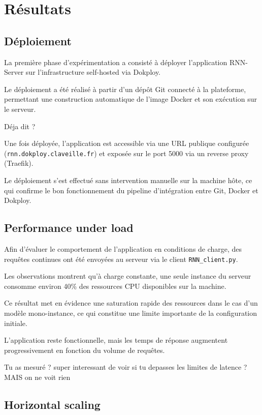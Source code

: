 \documentclass{rapportClass} %
\begin{document}
\chapter{Résultats}

\section{Déploiement}

La première phase d’expérimentation a consisté à déployer l’application
RNN-Server sur l’infrastructure self-hosted via Dokploy.

Le déploiement a été réalisé à partir d’un dépôt Git connecté à la
plateforme, permettant une construction automatique de l’image Docker
et son exécution sur le serveur.

{\color{red} Déja dit ? }

Une fois déployée, l’application est accessible via une URL publique
configurée (\texttt{rnn.dokploy.claveille.fr}) et exposée sur le port
5000 via un reverse proxy (Traefik).

Le déploiement s’est effectué sans intervention manuelle sur la
machine hôte, ce qui confirme le bon fonctionnement du pipeline
d’intégration entre Git, Docker et Dokploy.

\section{Performance under load}

Afin d’évaluer le comportement de l’application en conditions de
charge, des requêtes continues ont été envoyées au serveur via le
client \texttt{RNN\_client.py}.

Les observations montrent qu’à charge constante, une seule instance du
serveur consomme environ 40\% des ressources CPU disponibles sur la
machine.

Ce résultat met en évidence une saturation rapide des ressources dans
le cas d’un modèle mono-instance, ce qui constitue une limite
importante de la configuration initiale.

L’application reste fonctionnelle, mais les temps de réponse
augmentent progressivement en fonction du volume de requêtes.

{\color{red} Tu as mesuré ? super interessant de voir si tu depasses les limites de latence ?
MAIS on ne voit rien }

\section{Horizontal scaling}
\end{document}
